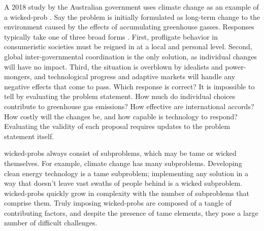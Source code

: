 A 2018 study by the Australian government uses climate change as an example of a \ac{wicked-prob}
\cite{commission_tackling_2018}. Say the problem is initially formulated as long-term change to the environment caused
by the effects of accumulating greenhouse gasses. Responses typically take one of three broad forms
\cite{commission_tackling_2018}. First, profligate behavior in consumeristic societies must be reigned in at a local and
personal level. Second, global inter-governmental coordination is the only solution, as individual changes will have no
impact. Third, the situation is overblown by idealists and power-mongers, and technological progress and adaptive
markets will handle any negative effects that come to pass. Which response is correct? It is impossible to tell by
evaluating the problem statement. How much do individual choices contribute to greenhouse gas emissions? How effective
are international accords? How costly will the changes be, and how capable is technology to respond? Evaluating the
validity of each proposal requires updates to the problem statement itself.


\Acp{wicked-prob} always consist of subproblems, which may be tame or wicked themselves. For example, climate change has
many subproblems. Developing clean energy technology is a tame subproblem; implementing any solution in a way that
doesn't leave vast swaths of people behind is a wicked subproblem. \Acp{wicked-prob} quickly grow in complexity with the
number of subproblems that comprise them. Truly imposing \acp{wicked-prob} are composed of a tangle of contributing
factors, and despite the presence of tame elements, they pose a large number of difficult challenges.



